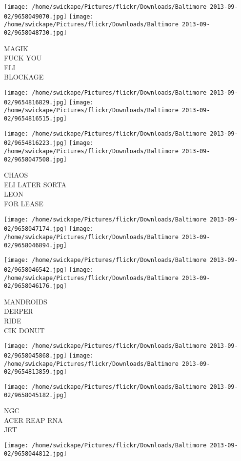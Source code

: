 \documentclass[10pt,letterpaper]{article}
\begin{document}
\texttt{[image: /home/swickape/Pictures/flickr/Downloads/Baltimore 2013-09-02/9658049070.jpg]}
\texttt{[image: /home/swickape/Pictures/flickr/Downloads/Baltimore 2013-09-02/9658048730.jpg]}

MAGIK\\
FUCK YOU\\
ELI\\
BLOCKAGE
\pagebreak

\texttt{[image: /home/swickape/Pictures/flickr/Downloads/Baltimore 2013-09-02/9654816829.jpg]}
\texttt{[image: /home/swickape/Pictures/flickr/Downloads/Baltimore 2013-09-02/9654816515.jpg]}

\texttt{[image: /home/swickape/Pictures/flickr/Downloads/Baltimore 2013-09-02/9654816223.jpg]}
\texttt{[image: /home/swickape/Pictures/flickr/Downloads/Baltimore 2013-09-02/9658047508.jpg]}

CHAOS\\
ELI LATER SORTA\\
LEON\\
FOR LEASE
\pagebreak

\texttt{[image: /home/swickape/Pictures/flickr/Downloads/Baltimore 2013-09-02/9658047174.jpg]}
\texttt{[image: /home/swickape/Pictures/flickr/Downloads/Baltimore 2013-09-02/9658046894.jpg]}

\texttt{[image: /home/swickape/Pictures/flickr/Downloads/Baltimore 2013-09-02/9658046542.jpg]}
\texttt{[image: /home/swickape/Pictures/flickr/Downloads/Baltimore 2013-09-02/9658046176.jpg]}

MANDROIDS\\
DERPER\\
RIDE\\
CIK DONUT
\pagebreak

\texttt{[image: /home/swickape/Pictures/flickr/Downloads/Baltimore 2013-09-02/9658045868.jpg]}
\texttt{[image: /home/swickape/Pictures/flickr/Downloads/Baltimore 2013-09-02/9654813859.jpg]}

\texttt{[image: /home/swickape/Pictures/flickr/Downloads/Baltimore 2013-09-02/9658045182.jpg]}

NGC\\
ACER REAP RNA\\
JET
\pagebreak

\texttt{[image: /home/swickape/Pictures/flickr/Downloads/Baltimore 2013-09-02/9658044812.jpg]}
\end{document}
